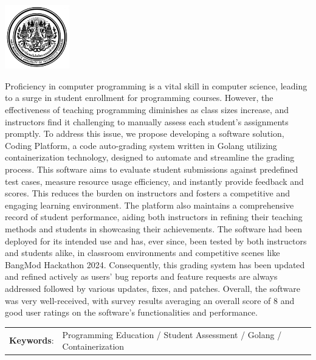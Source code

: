 \documentclass[12pt,one side,openright,a4paper]{cpe-thesis-th}
\begin{document}
\pdfstringdefDisableCommands{
  \let\MakeUppercase\relax
}

\begin{center}
  \includegraphics[width=2.8cm]{./figure/logo02.jpg}
\end{center}
\vspace*{-1cm}

\maketitlepage
\makesignaturepage

\abstract
Proficiency in computer programming is a vital skill in computer science, leading to a surge in student enrollment for programming courses. However, the effectiveness of teaching programming diminishes as class sizes increase, and instructors find it challenging to manually assess each student's assignments promptly. To address this issue, we propose developing a software solution, Coding Platform, a code auto-grading system written in Golang utilizing containerization technology, designed to automate and streamline the grading process. This software aims to evaluate student submissions against predefined test cases, measure resource usage efficiency, and instantly provide feedback and scores. This reduces the burden on instructors and fosters a competitive and engaging learning environment. The platform also maintains a comprehensive record of student performance, aiding both instructors in refining their teaching methods and students in showcasing their achievements. The software had been deployed for its intended use and has, ever since, been tested by both instructors and students alike, in classroom environments and competitive scenes like BangMod Hackathon 2024. Consequently, this grading system has been updated and refined actively as users' bug reports and feature requests are always addressed followed by various updates, fixes, and patches. Overall, the software was very well-received, with survey results averaging an overall score of 8 and good user ratings on the software's functionalities and performance.

\justifying
\begin{tabular*}{\textwidth}{@{}lp{}}
  \textbf{Keywords}: & Programming Education / Student Assessment / Golang / Containerization
\end{tabular*}
\vspace{1mm}
\endabstract
\end{document}
